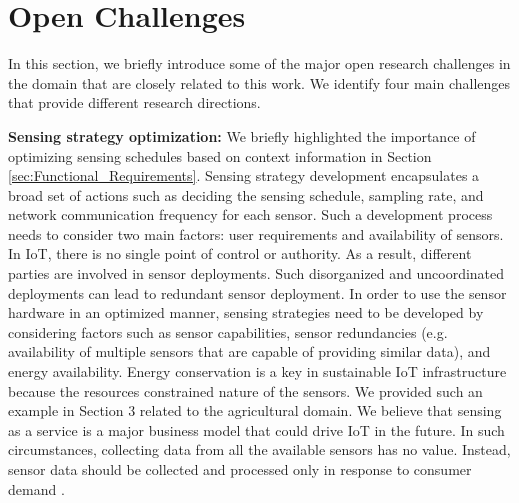 \documentclass[graybox]{svmult}
\begin{document}
\section{Open Challenges}
\label{sec:Open_Challenges}

In this section, we briefly introduce some of the major open research challenges in the domain that are closely related to this work. We identify four main challenges that provide different research directions.




\textbf{Sensing strategy optimization:} We briefly highlighted the importance of optimizing sensing schedules based on context information in Section \ref{sec:Functional_Requirements}. Sensing strategy development encapsulates a broad set of actions such as deciding the sensing schedule, sampling rate, and network  communication frequency for each sensor. Such a development process needs to consider two main factors: user requirements and availability of sensors. In IoT, there is no single point of control or authority. As a result, different parties are involved in sensor deployments. Such disorganized and uncoordinated deployments can lead to redundant sensor deployment. In order to use the sensor hardware in an optimized manner, sensing strategies need to be developed by considering factors such as sensor capabilities, sensor redundancies (e.g. availability of multiple sensors that are capable of providing similar data), and energy availability. Energy conservation is a key in sustainable IoT infrastructure because the resources constrained  nature of the sensors. We provided such an example in Section 3 related to the agricultural domain. We believe that sensing as a service is a major business model that could drive IoT in the future. In such circumstances, collecting data from all the available sensors has no value. Instead, sensor data should be collected and processed only in response to consumer demand \cite{ZMP008}.
\end{document}
